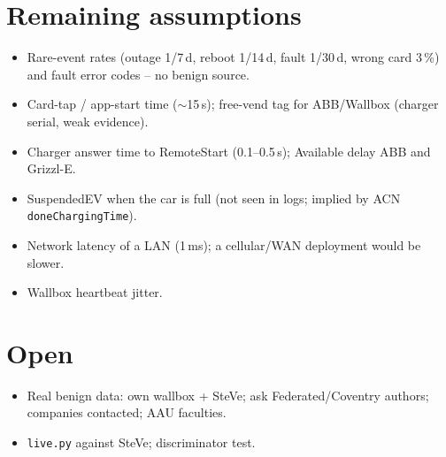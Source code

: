 \documentclass[11pt]{article}
\begin{document}
\section{Remaining assumptions}
\begin{itemize}
  \item Rare-event rates (outage 1/7\,d, reboot 1/14\,d, fault 1/30\,d, wrong card 3\,\%) and fault error codes -- no benign source.
  \item Card-tap / app-start time ($\sim$15\,s); free-vend tag for ABB/Wallbox (charger serial, weak evidence).
  \item Charger answer time to RemoteStart (0.1--0.5\,s); Available delay ABB and Grizzl-E.
  \item SuspendedEV when the car is full (not seen in logs; implied by ACN \texttt{doneChargingTime}).
  \item Network latency of a LAN (1\,ms); a cellular/WAN deployment would be slower.
  \item Wallbox heartbeat jitter.
\end{itemize}

\section{Open}
\begin{itemize}
  \item Real benign data: own wallbox + SteVe; ask Federated/Coventry authors; companies contacted; AAU faculties.
  \item \texttt{live.py} against SteVe; discriminator test.
\end{itemize}
\end{document}
